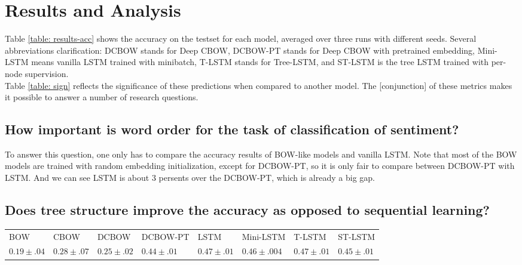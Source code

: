 \section{Results and Analysis}
\label{sec: results}
Table \ref{table: results-acc} shows the accuracy on the testset for each model,
averaged over three runs with different seeds. Several abbreviations
clarification: DCBOW stands for Deep CBOW, DCBOW-PT stands for Deep CBOW with
pretrained embedding, Mini-LSTM means vanilla LSTM trained with minibatch,
T-LSTM stands for Tree-LSTM, and ST-LSTM is the tree LSTM trained with per-node
supervision. \\ Table \ref{table: sign} reflects the significance of these
predictions when compared to another model. The [conjunction] of these metrics
makes it possible to answer a number of research questions. \\
    \vspace{-10pt}
    \subsection{How important is word order for the task of classification of
    sentiment?} To answer this question, one only has to compare the accuracy
    results of BOW-like models and vanilla LSTM. Note that most of the BOW
    models are trained with random embedding initialization, except for
    DCBOW-PT, so it is only fair to compare between DCBOW-PT with LSTM. And we
    can see LSTM is about 3 persents over the DCBOW-PT, which is already a big
    gap.
    \subsection{Does tree structure improve the accuracy as opposed to
    sequential learning?} 

\begin{table*}[]
    \centering
    \small
    \begin{tabular}{llllllll}
    BOW  & CBOW & DCBOW & DCBOW-PT & LSTM & Mini-LSTM & T-LSTM & ST-LSTM \\
    $0.19\pm .04$ & $0.28\pm .07$ & $0.25\pm .02$ & $0.44\pm .01$ & $0.47\pm .01$ & $0.46\pm .004$ & $0.47\pm .01$ & $0.45\pm .01$ 
    \end{tabular}
    \label{table: results-acc}
    \caption{Test-set accuracies of three models averaged over 3 seeds}
\end{table*}


